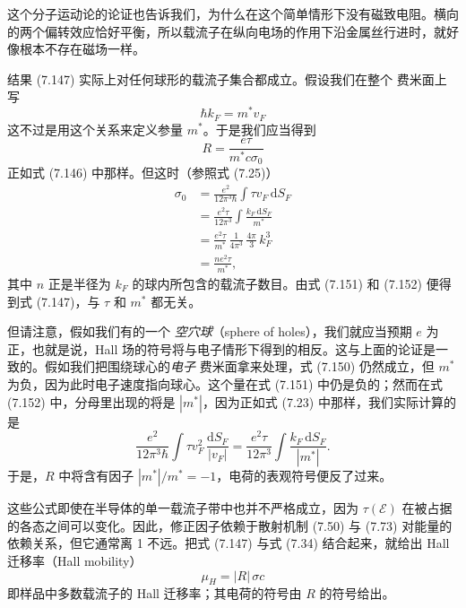 这个分子运动论的论证也告诉我们，为什么在这个简单情形下没有磁致电阻。横向的两个偏转效应恰好平衡，所以载流子在纵向电场的作用下沿金属丝行进时，就好像根本不存在磁场一样。

结果 (7.147) 实际上对任何球形的载流子集合都成立。假设我们在整个 费米面上写
\begin{equation*}
\hbar k_{F}=m^{*}v_{F}\tag{7.150}
\end{equation*}
这不过是用这个关系来定义参量 $m^{*}$。于是我们应当得到
\begin{equation*}
R=\frac{e\tau}{m^{*}c\sigma_{0}}\tag{7.151}
\end{equation*}
正如式 (7.146) 中那样。但这时（参照式 (7.25)）
\begin{align*}
\sigma_{0}&=\frac{e^{2}}{12\pi^{3}\hbar}\int\tau v_{F}\,\mathrm{d}S_{F}\\
&=\frac{e^{2}\tau}{12\pi^{3}}\int\frac{k_{F}\,\mathrm{d}S_{F}}{m^{*}}\\
&=\frac{e^{2}\tau}{m^{*}}\,\frac{1}{4\pi^{3}}\,\frac{4\pi}{3}\,k_{F}^{3}\\
&=\frac{ne^{2}\tau}{m^{*}},\tag{7.152}
\end{align*}
其中 $n$ 正是半径为 $k_{F}$ 的球内所包含的载流子数目。由式 (7.151) 和 (7.152) 便得到式 (7.147)，与 $\tau$ 和 $m^{*}$ 都无关。

但请注意，假如我们有的一个 \emph{空穴球}（sphere of holes），我们就应当预期 $e$ 为正，也就是说，Hall 场的符号将与电子情形下得到的相反。这与上面的论证是一致的。假如我们把围绕球心的\emph{电子} 费米面拿来处理，式 (7.150) 仍然成立，但 $m^{*}$ 为负，因为此时电子速度指向球心。这个量在式 (7.151) 中仍是负的；然而在式 (7.152) 中，分母里出现的将是 $|m^{*}|$，因为正如式 (7.23) 中那样，我们实际计算的是
\begin{equation*}
\frac{e^{2}}{12\pi^{3}\hbar}\int\tau v_{F}^{2}\,\frac{\mathrm{d}S_{F}}{|v_{F}|}=\frac{e^{2}\tau}{12\pi^{3}}\int\frac{k_{F}\,\mathrm{d}S_{F}}{|m^{*}|}.\tag{7.153}
\end{equation*}
于是，$R$ 中将含有因子 $|m^{*}|/m^{*}=-1$，电荷的表观符号便反了过来。

这些公式即使在半导体的单一载流子带中也并不严格成立，因为 $\tau(\mathcal{E})$ 在被占据的各态之间可以变化。因此，修正因子依赖于散射机制 (7.50) 与 (7.73) 对能量的依赖关系，但它通常离 1 不远。把式 (7.147) 与式 (7.34) 结合起来，就给出 Hall 迁移率（Hall mobility）
\begin{equation*}
\mu_{H}=|R|\,\sigma c\tag{7.154}
\end{equation*}
即样品中多数载流子的 Hall 迁移率；其电荷的符号由 $R$ 的符号给出。

